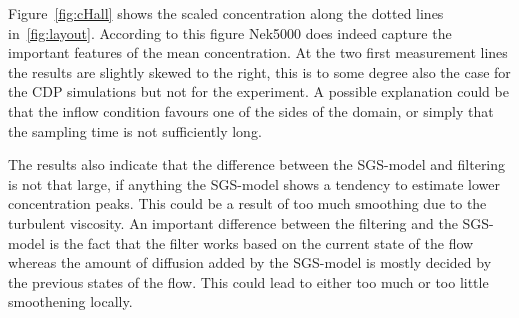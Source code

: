 Figure~\ref{fig:cHall} shows the scaled concentration along the dotted lines in~\ref{fig:layout}. 
According to this figure Nek5000 does indeed capture the important features of the mean concentration.
At the two first measurement lines the results are slightly skewed to the right, this is to some degree 
also the case for the CDP simulations but not for the experiment. A possible explanation could be that 
the inflow condition favours one of the sides of the domain, or simply that the sampling time is not 
sufficiently long. 

The results also indicate that the difference between the SGS-model and filtering
is not that large,
if anything the SGS-model shows a tendency to estimate lower concentration peaks. This could be a 
result of too much smoothing due to the turbulent viscosity. An important difference between the 
filtering and the SGS-model is the fact that the filter works based on the current state of the flow 
whereas the amount of diffusion added by the SGS-model is mostly decided by the previous states of the 
flow. This could lead to either too much or too little smoothening locally.

